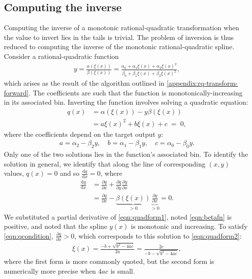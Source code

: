 \subsection{Computing the inverse}
\label{appendix-rq-transform-inverse}
Computing the inverse of a monotonic rational-quadratic transformation when the value to invert lies in the tails is trivial. 
The problem of inversion is thus reduced to computing the inverse of the monotonic rational-quadratic spline. 
Consider a rational-quadratic function 
\begin{align}
    y = \frac{\alpha(\xi(x))}{\beta(\xi(x))} = \frac{\alpha_{0} + \alpha_{1} \xi(x) + \alpha_{2} \xi(x)^{2}}{\beta_{0} + \beta_{1} \xi(x) + \beta_{2} \xi(x)^{2}},
\end{align}
which arises as the result of the algorithm outlined in \cref{appendix:rq-transform-forward}.
The coefficients are such that the function is monotonically-increasing in its associated bin. Inverting the function involves solving a quadratic equation:
\begin{align}
        q(x) &= \alpha(\xi(x)) - y\beta(\xi(x)) \label{eqn:quadform1}\\
        &= a\xi(x)^2 + b\xi(x) + c \;=\; 0, \label{eqn:quadform2}
\end{align}
where the coefficients depend on the target output $y$:
\begin{align}
	a = \alpha_{2} - \beta_{2} y, \quad b = \alpha_{1} - \beta_{1} y, \quad c = \alpha_{0} - \beta_{0} y.
\end{align}
Only one of the two solutions lies in the function's associated bin. To identify the solution in general, we
identify that along the line of corresponding $(x,y)$ values, $q(x)\!=\!0$ and so $\frac{\mathrm{d}q}{\mathrm{d}x}\!=\!0$, where
\begin{align}
    \frac{\mathrm{d}q}{\mathrm{d}x} &= \frac{\partial q}{\partial x} + \frac{\partial q}{\partial y}\frac{\partial y}{\partial x} \\
    &= \frac{\partial q}{\partial x} - \underbrace{\beta(\xi(x))}_{>0}\underbrace{\frac{\partial y}{\partial x}}_{>0} = 0. \label{eqn:qcondition}
\end{align}
We substituted a partial derivative of \cref{eqn:quadform1}, noted \cref{eqn:betafn} is positive, and noted that the spline $y(x)$ is monotonic and increasing.
To satisfy \cref{eqn:qcondition}, $\frac{\partial q}{\partial x}\!>\!0$, which corresponds to this solution to \cref{eqn:quadform2}:
\begin{align}
    \xi(x) = \frac{- b + \sqrt{ b^{2} - 4 a c}}{2 a} = \frac{2c}{- b - \sqrt{ b^{2} - 4 a c}},
\end{align}
where the first form is more commonly quoted, but the second form is numerically more precise when $4ac$ is small.

